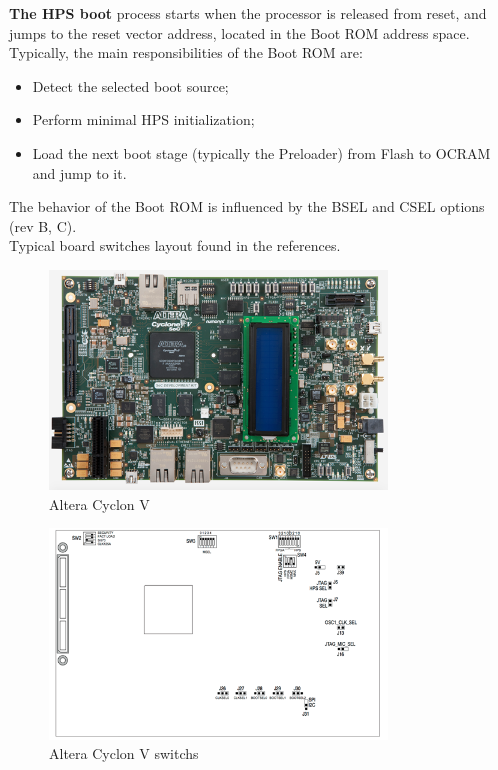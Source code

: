 \textbf{The HPS boot} process starts when the processor is released from reset, and jumps to the reset vector address, located in the Boot ROM address space.\newline
Typically, the main responsibilities of the Boot ROM are: 
\begin{itemize}
\item Detect the selected boot source;
\item Perform minimal HPS initialization; 
\item Load the next boot stage (typically the Preloader) from Flash to OCRAM and jump to it.
\end{itemize}
The behavior of the Boot ROM is influenced by the BSEL and CSEL options (rev B, C).\\
Typical board switches layout found in the references.
\begin{figure}[h]
	\centering		\includegraphics[width=0.8\textwidth]{img/ciclonv1}
	\caption{Altera Cyclon V}
    	\label{fig:ciclonv1}
\end{figure}
\begin{figure}[h]
	\centering		\includegraphics[width=0.8\textwidth]{img/ciclonv2}
	\caption{Altera Cyclon V switchs}
    	\label{fig:ciclonv2}
\end{figure}

